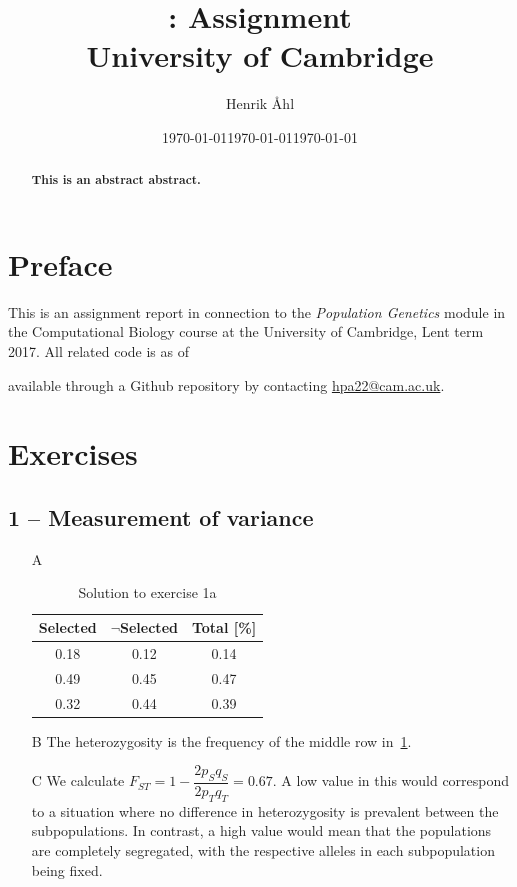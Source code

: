 \documentclass[10pt]{article}\usepackage[]{graphicx}\usepackage[]{color}
\title{
  \bf \course: Assignment \ass \\[1em]
  \small{University of Cambridge}
}
\author{Henrik Åhl}
\date{\today}
\theoremstyle{plain}
\newcommand{\course}{Population Genetics}
\newcommand{\term}{Lent term 2017}
\begin{document}
\date{\today}
\maketitle
\setcounter{page}{1}


\maketitle
\begin{abstract}
{\bf 
  This is an abstract abstract.
}
\end{abstract}

\begin{multicols*}{2}
\section*{Preface}
This is an assignment report in connection to the \textit{\course}
module in the Computational Biology course at the University of Cambridge,
\term. All related code is as of \date{\today} available through a
Github repository by contacting \href{mailto:hpa22@cam.ac.uk}{hpa22@cam.ac.uk}.

\section*{Exercises}
\subsection*{1 -- Measurement of variance}
\begin{enumerate}
  \item[A]~ \begin{table}[H]
     \centering
     \vspace{-.6cm}
     \caption{Solution to exercise 1a}\label{tab:exc1}
     \begin{tabular}{ccc}
       \toprule
       Selected  & $\neg$Selected  & Total [\%]\\
       \midrule
       0.18  & 0.12  & 0.14 \\
       0.49  & 0.45  & 0.47 \\
       0.32  & 0.44  & 0.39 \\\bottomrule
     \end{tabular}
   \end{table}
  \item[B] The heterozygosity is the frequency of the middle row in~\cref{tab:exc1}.
  \item[C] We calculate $F_{ST} = 1 - \dfrac{2p_Sq_S}{2p_Tq_T} =
    0.67$. A low value in this would correspond to a situation where no
    difference in heterozygosity is prevalent between the subpopulations. In
    contrast, a high value would mean that the populations are completely
    segregated, with the respective alleles in each subpopulation being fixed.
\end{enumerate}

\end{multicols*}
\end{document}
